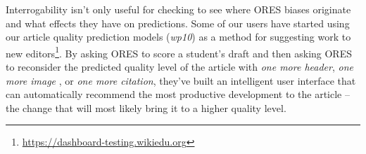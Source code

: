 Interrogability isn't only useful for checking to see where ORES biases originate and what effects they have on predictions.  Some of our users have started using our article quality prediction models (\emph{wp10}) as a method for suggesting work to new editors\footnote{\url{https://dashboard-testing.wikiedu.org}}.  By asking ORES to score a student's draft and then asking ORES to reconsider the predicted quality level of the article with \emph{one more header}, \emph{one more image} , or \emph{one more citation}, they've built an intelligent user interface that can automatically recommend the most productive development to the article -- the change that will most likely bring it to a higher quality level.
